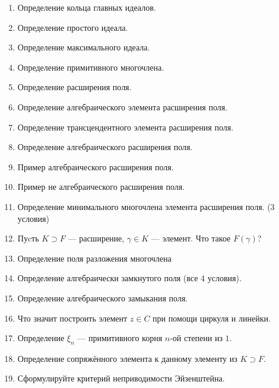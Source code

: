 \begin{enumerate}
\item Определение кольца главных идеалов.

\item Определение простого идеала.

\item Определение максимального идеала.

\item Определение примитивного многочлена.

\item Определение расширения поля.

\item Определение алгебраического элемента расширения поля.

\item Определение трансцендентного элемента расширения поля.

\item Определение алгебраического расширения поля.

\item Пример алгебраического расширения поля.

\item Пример не алгебраического расширения поля.

\item Определение минимального многочлена элемента расширения поля. (3 условия)

\item Пуcть $K \supset F$  --- расширение, $\gamma \in K$ --- элемент. Что такое $F(\gamma)$?

\item Определение поля разложения многочлена

\item Определение алгебраически замкнутого поля (все 4 условия).

\item Определение алгебраического замыкания поля.

\item Что значит построить элемент $z \in C$ при помощи циркуля и линейки.

\item Определение $\xi_n$ --- примитивного корня $n$-ой степени из $1$.

\item Определение сопряжённого элемента к данному элементу из $K \supset F$.

\item Сформулируйте критерий неприводимости Эйзенштейна.


\end{enumerate}
